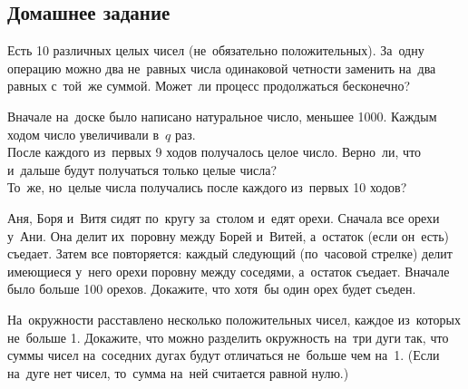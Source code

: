 

\subsection*{Домашнее задание}




\begin{problems}

\item
Есть 10 различных целых чисел (не~обязательно положительных).
За~одну операцию можно два не~равных числа одинаковой четности заменить
на~два равных с~той~же суммой.
Может~ли процесс продолжаться бесконечно?

\item
Вначале на~доске было написано натуральное число, меньшее 1000.
Каждым ходом число увеличивали в~$q$ раз.
\\
\sp
После каждого из~первых 9 ходов получалось целое число.
Верно~ли, что и~дальше будут получаться только целые числа?
\\
\sp
То~же, но~целые числа получались после каждого из~первых 10 ходов?

\item
Аня, Боря и~Витя сидят по~кругу за~столом и~едят орехи.
Сначала все орехи у~Ани.
Она делит их~поровну между Борей и~Витей, а~остаток (если он~есть) съедает.
Затем все повторяется: каждый следующий (по~часовой стрелке) делит имеющиеся
у~него орехи поровну между соседями, а~остаток съедает.
Вначале было больше 100 орехов.
Докажите, что хотя~бы один орех будет съеден.

\item
На~окружности расставлено несколько положительных чисел, каждое из~которых
не~больше 1.
Докажите, что можно разделить окружность на~три дуги так, что суммы чисел
на~соседних дугах будут отличаться не~больше чем на~1.
(Если на~дуге нет чисел, то~сумма на~ней считается равной нулю.)

\end{problems}

